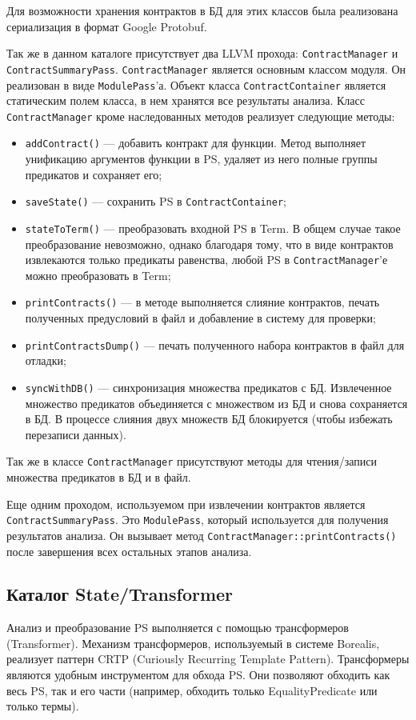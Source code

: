 Для возможности хранения контрактов в БД для этих классов была реализована сериализация в формат Google Protobuf\cite{protobuf}. 

Так же в данном каталоге присутствует два LLVM прохода: \texttt{ContractManager} и \texttt{ContractSummaryPass}. \texttt{ContractManager} является основным классом модуля. Он реализован в виде \texttt{ModulePass}'а. Объект класса \texttt{ContractContainer} является статическим полем класса, в нем хранятся все результаты анализа. Класс \texttt{ContractManager} кроме наследованных методов реализует следующие методы:
\begin{itemize}
\item \texttt{addContract()} --- добавить контракт для функции. Метод выполняет унификацию аргументов функции в PS, удаляет из него полные группы предикатов и сохраняет его;
\item \texttt{saveState()} --- сохранить PS в \texttt{ContractContainer};
\item \texttt{stateToTerm()} --- преобразовать входной PS в Term. В общем случае такое преобразование невозможно, однако благодаря тому, что в виде контрактов извлекаются только предикаты равенства, любой PS в \texttt{ContractManager}'е можно преобразовать в Term;
\item \texttt{printContracts()} --- в методе выполняется слияние контрактов, печать полученных предусловий в файл и добавление в систему для проверки;
\item \texttt{printContractsDump()} --- печать полученного набора контрактов в файл для отладки;
\item \texttt{syncWithDB()} --- синхронизация множества предикатов с БД. Извлеченное множество предикатов объединяется с множеством из БД и снова сохраняется в БД. В процессе слияния двух множеств БД блокируется (чтобы избежать перезаписи данных).
\end{itemize}

Так же в классе \texttt{ContractManager} присутствуют методы для чтения/записи множества предикатов в БД и в файл.

Еще одним проходом, используемом при извлечении контрактов является \texttt{ContractSummaryPass}. Это \texttt{ModulePass}, который используется для получения результатов анализа. Он вызывает метод \texttt{ContractManager::printContracts()} после завершения всех остальных этапов анализа.

\subsection{Каталог State/Transformer}
Анализ и преобразование PS выполняется с помощью трансформеров (Transformer). Механизм трансформеров, используемый в системе Borealis, реализует паттерн CRTP (Curiously Recurring Template Pattern)\cite{crtp}. Трансформеры являются удобным инструментом для обхода PS. Они позволяют обходить как весь PS, так и его части (например, обходить только EqualityPredicate или только термы).


